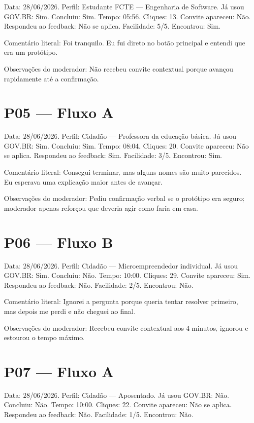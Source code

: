 \begin{apendicesenv}
Data: 28/06/2026. Perfil: Estudante FCTE --- Engenharia de Software. Já usou GOV.BR: Sim. Concluiu: Sim. Tempo: 05:56. Cliques: 13. Convite apareceu: Não. Respondeu ao feedback: Não se aplica. Facilidade: 5/5. Encontrou: Sim.

Comentário literal: Foi tranquilo. Eu fui direto no botão principal e entendi que era um protótipo.

Observações do moderador: Não recebeu convite contextual porque avançou rapidamente até a confirmação.

\section{P05 --- Fluxo A}
\label{sec:G.5}

Data: 28/06/2026. Perfil: Cidadão --- Professora da educação básica. Já usou GOV.BR: Sim. Concluiu: Sim. Tempo: 08:04. Cliques: 20. Convite apareceu: Não se aplica. Respondeu ao feedback: Sim. Facilidade: 3/5. Encontrou: Sim.

Comentário literal: Consegui terminar, mas alguns nomes são muito parecidos. Eu esperava uma explicação maior antes de avançar.

Observações do moderador: Pediu confirmação verbal se o protótipo era seguro; moderador apenas reforçou que deveria agir como faria em casa.

\section{P06 --- Fluxo B}
\label{sec:G.6}

Data: 28/06/2026. Perfil: Cidadão --- Microempreendedor individual. Já usou GOV.BR: Sim. Concluiu: Não. Tempo: 10:00. Cliques: 29. Convite apareceu: Sim. Respondeu ao feedback: Não. Facilidade: 2/5. Encontrou: Não.

Comentário literal: Ignorei a pergunta porque queria tentar resolver primeiro, mas depois me perdi e não cheguei ao final.

Observações do moderador: Recebeu convite contextual aos 4 minutos, ignorou e estourou o tempo máximo.

\section{P07 --- Fluxo A}
\label{sec:G.7}

Data: 28/06/2026. Perfil: Cidadão --- Aposentado. Já usou GOV.BR: Não. Concluiu: Não. Tempo: 10:00. Cliques: 22. Convite apareceu: Não se aplica. Respondeu ao feedback: Não. Facilidade: 1/5. Encontrou: Não.


\end{apendicesenv}
